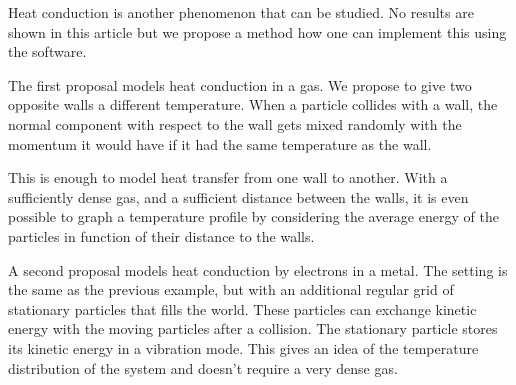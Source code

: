 Heat conduction is another phenomenon that can be studied. No results are shown 
in this article but we propose a method how one can implement this using the 
software.

The first proposal models heat conduction in a gas. We propose to give two 
opposite walls a different temperature. When a particle collides with a 
wall, the normal component with respect to the wall gets mixed randomly 
with the momentum it would have if it had the same temperature as the wall.  

This is enough to model heat transfer from one wall to another. With a 
sufficiently dense gas, and a sufficient distance between the walls, it is 
even possible to graph a temperature profile by considering the average 
energy of the particles in function of their distance to the walls.

A second proposal models heat conduction by electrons in a metal. The 
setting is the same as the previous example, but with an additional regular 
grid of stationary particles that fills the world. These particles can 
exchange kinetic energy with the moving particles after a collision. The 
stationary particle stores its kinetic energy in a vibration mode. This 
gives an idea of the temperature distribution of the system and doesn't 
require a very dense gas.
